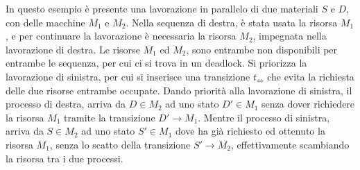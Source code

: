 \documentclass{article}
\numberwithin{equation}{subsection}
\begin{document}
\begin{center}
\end{center}
In questo esempio è presente una lavorazione in parallelo di due materiali $S$ e $D$, con delle macchine $M_1$ e $M_2$. Nella sequenza di destra, è stata 
usata la risorsa $M_1$, e per continuare la lavorazione è necessaria la risorsa $M_2$, impegnata nella 
lavorazione di destra. Le risorse $M_1$ ed $M_2$, sono entrambe non 
disponibili per entrambe le sequenza, per cui ci si trova in un deadlock. Si priorizza la lavorazione di sinistra, 
per cui si inserisce una transizione $t_{\iff}$ che evita la richiesta delle due risorse entrambe occupate. 
Dando priorità alla lavorazione di sinistra, il processo di destra, arriva da $ D\in M_2$ ad uno stato $ D'\in M_1$ senza dover 
richiedere la risorsa $M_1$ tramite la transizione $ D'\to M_1$. Mentre il processo di sinistra, arriva da $S\in M_2$ ad uno stato $S'\in M_1$ dove ha già 
richiesto ed ottenuto la risorsa $M_1$, senza lo scatto della transizione $S'\to M_2$, effettivamente scambiando la risorsa tra i due processi. 
\end{document}
